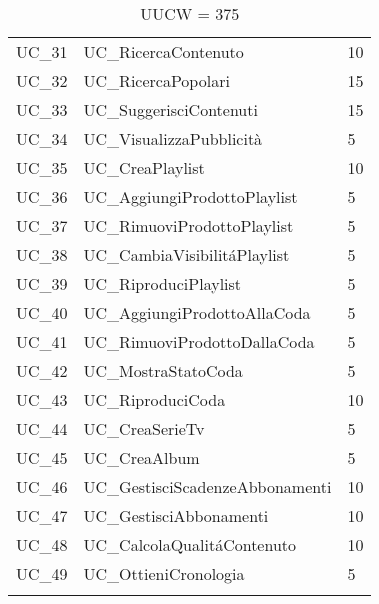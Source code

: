 \begin{longtable}{| p{} | p{} | p{} |}
UC\_31 & UC\_RicercaContenuto & 10\\
UC\_32 & UC\_RicercaPopolari & 15\\
UC\_33 & UC\_SuggerisciContenuti & 15\\
UC\_34 & UC\_VisualizzaPubblicità & 5\\
UC\_35 & UC\_CreaPlaylist & 10\\
UC\_36 & UC\_AggiungiProdottoPlaylist & 5\\
UC\_37 & UC\_RimuoviProdottoPlaylist & 5\\
UC\_38 & UC\_CambiaVisibilitáPlaylist & 5\\
UC\_39 & UC\_RiproduciPlaylist & 5\\
UC\_40 & UC\_AggiungiProdottoAllaCoda & 5\\
UC\_41 & UC\_RimuoviProdottoDallaCoda & 5\\
UC\_42 & UC\_MostraStatoCoda & 5\\
UC\_43 & UC\_RiproduciCoda & 10\\
UC\_44 & UC\_CreaSerieTv & 5\\
UC\_45 & UC\_CreaAlbum & 5\\
UC\_46 & UC\_GestisciScadenzeAbbonamenti & 10\\
UC\_47 & UC\_GestisciAbbonamenti & 10\\
UC\_48 & UC\_CalcolaQualitáContenuto & 10\\
UC\_49 & UC\_OttieniCronologia & 5\\\hline
\caption*{UUCW = 375}
\end{longtable}

